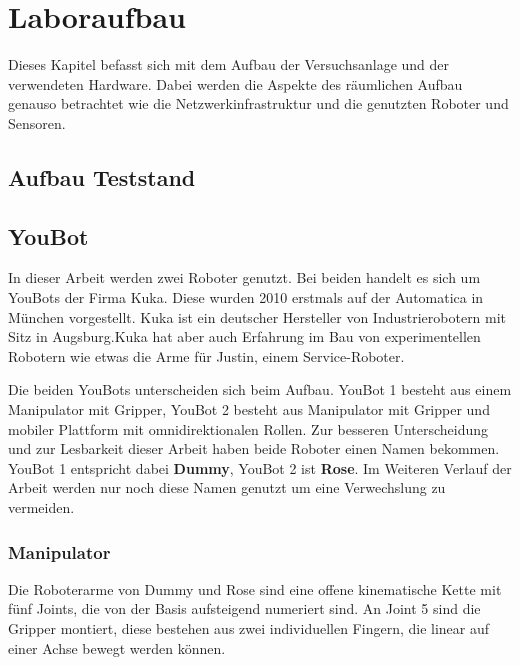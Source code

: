 \section{Laboraufbau}
\label{sec:basic-aufbau}
    
Dieses Kapitel befasst sich mit dem Aufbau der Versuchsanlage und der verwendeten Hardware. Dabei werden die Aspekte des räumlichen Aufbau genauso betrachtet wie die Netzwerkinfrastruktur und die genutzten Roboter und Sensoren.



\subsection{Aufbau Teststand}

% 
% 

\subsection{YouBot}
In dieser Arbeit werden zwei Roboter genutzt. Bei beiden handelt es sich um YouBots der Firma Kuka. Diese wurden 2010 erstmals auf der Automatica in München vorgestellt. Kuka ist ein deutscher Hersteller von Industrierobotern mit Sitz in Augsburg.Kuka hat aber auch Erfahrung im Bau von experimentellen Robotern wie etwas die Arme für Justin, einem Service-Roboter.

Die beiden YouBots unterscheiden sich beim Aufbau. YouBot 1 besteht aus einem Manipulator mit Gripper, YouBot 2 besteht aus Manipulator mit Gripper und mobiler Plattform mit omnidirektionalen Rollen. Zur besseren Unterscheidung und zur Lesbarkeit dieser Arbeit haben beide Roboter einen Namen bekommen. YouBot 1 entspricht dabei \textbf{Dummy}, YouBot 2 ist \textbf{Rose}. Im Weiteren Verlauf der Arbeit werden nur noch diese Namen genutzt um eine Verwechslung zu vermeiden.


\subsubsection{Manipulator}
 Die Roboterarme von Dummy und Rose sind eine offene kinematische Kette mit fünf Joints, die von der Basis aufsteigend numeriert sind. An Joint 5 sind die Gripper montiert, diese bestehen aus zwei individuellen Fingern, die linear auf einer Achse bewegt werden können.

